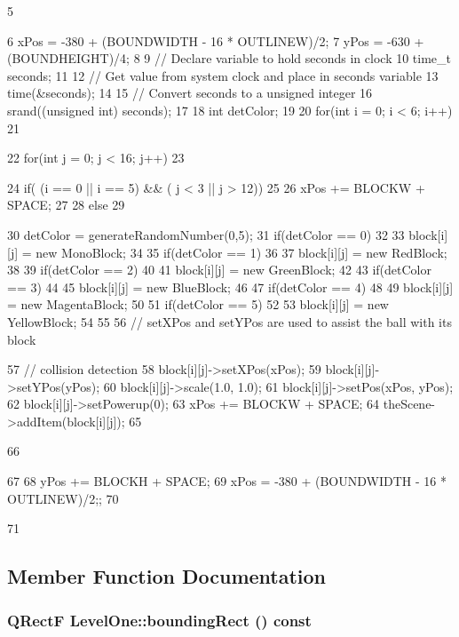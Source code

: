 \begin{DoxyCode}
5 {
6     xPos = -380 + (BOUNDWIDTH - 16 * OUTLINEW)/2;
7     yPos = -630 + (BOUNDHEIGHT)/4;
8 
9     // Declare variable to hold seconds in clock
10     time_t seconds;
11 
12     // Get value from system clock and place in seconds variable
13     time(&seconds);
14 
15     // Convert seconds to a unsigned integer
16     srand((unsigned int) seconds);
17 
18     int detColor;
19 
20     for(int i = 0; i < 6; i++)
21     {
22        for(int j = 0; j < 16; j++)
23         {
24             if( (i == 0 || i == 5) && ( j < 3 || j > 12))
25             {
26                  xPos += BLOCKW + SPACE;
27              }
28             else
29             {
30                 detColor = generateRandomNumber(0,5);
31                 if(detColor == 0)
32                 {
33                     block[i][j] = new MonoBlock;
34                 }
35                 if(detColor == 1)
36                 {
37                     block[i][j] = new RedBlock;
38                 }
39                 if(detColor == 2)
40                 {
41                     block[i][j] = new GreenBlock;
42                 }
43                 if(detColor == 3)
44                 {
45                     block[i][j] = new BlueBlock;
46                 }
47                 if(detColor == 4)
48                 {
49                     block[i][j] = new MagentaBlock;
50                 }
51                 if(detColor == 5)
52                 {
53                     block[i][j] = new YellowBlock;
54                 }
55 
56                 // setXPos and setYPos are used to assist the ball with its block
      
57                 // collision detection
58                 block[i][j]->setXPos(xPos);
59                 block[i][j]->setYPos(yPos);
60                 block[i][j]->scale(1.0, 1.0);
61                 block[i][j]->setPos(xPos, yPos);
62                 block[i][j]->setPowerup(0);
63                 xPos += BLOCKW + SPACE;
64                 theScene->addItem(block[i][j]);
65             }
66         }
67 
68         yPos += BLOCKH + SPACE;
69         xPos = -380 + (BOUNDWIDTH - 16 * OUTLINEW)/2;;
70     }
71 }
\end{DoxyCode}


\subsection{Member Function Documentation}
\hypertarget{class_level_one_a3a02de10455bcfbbd8994807dd23bf05}{
\subsubsection[{boundingRect}]{\setlength{\rightskip}{0pt plus 5cm}QRectF LevelOne::boundingRect () const}}
\label{class_level_one_a3a02de10455bcfbbd8994807dd23bf05}



